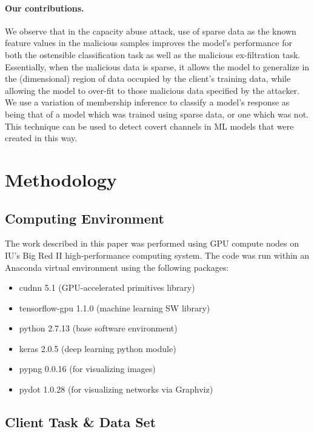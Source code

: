 \paragraph{Our contributions.} We observe that in the capacity abuse attack, use of sparse data as the known feature values in the malicious samples improves the model's performance for both the ostensible classification task as well as the malicious ex-filtration task.  Essentially, when the malicious data is sparse, it allows the model to generalize in the (dimensional) region of data occupied by the client's training data, while allowing the model to over-fit to those malicious data specified by the attacker.  We use a variation of membership inference to classify a model's response as being that of a model which was trained using sparse data, or one which was not.  This technique can be used to detect covert channels in ML models that were created in this way.


\section{Methodology}

\subsection{Computing Environment}

The work described in this paper was performed using GPU compute nodes on IU's Big Red II high-performance computing system.  The code was run within an Anaconda virtual environment using the following packages:

\begin{itemize}
    \item cudnn 5.1 (GPU-accelerated primitives library)
    \item tensorflow-gpu 1.1.0 (machine learning SW library)
    \item python 2.7.13 (base software environment)
    \item keras 2.0.5 (deep learning python module)
    \item pypng 0.0.16 (for visualizing images)
    \item pydot 1.0.28 (for visualizing networks via Graphviz)
\end{itemize}

\subsection{Client Task \& Data Set} 

